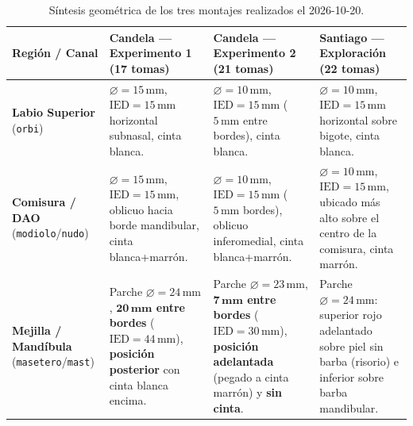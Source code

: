 \documentclass[11pt, a4paper]{article}
\begin{document}
\begin{table}[H]
\centering
\scriptsize
\begin{tabularx}{\textwidth}{l p{4.2cm} p{4.4cm} X}
\toprule
\textbf{Región / Canal} & \textbf{Candela --- Experimento 1} (17 tomas) & \textbf{Candela --- Experimento 2} (21 tomas) & \textbf{Santiago --- Exploración} (22 tomas) \\
\midrule
\textbf{Labio Superior} (\texttt{orbi}) & $\varnothing=15\,\text{mm}$, $\text{IED}=15\,\text{mm}$ horizontal subnasal, cinta blanca. & $\varnothing=10\,\text{mm}$, $\text{IED}=15\,\text{mm}$ ($5\,\text{mm}$ entre bordes), cinta blanca. & $\varnothing=10\,\text{mm}$, $\text{IED}=15\,\text{mm}$ horizontal sobre bigote, cinta blanca. \\
\textbf{Comisura / DAO} (\texttt{modiolo}/\texttt{nudo}) & $\varnothing=15\,\text{mm}$, $\text{IED}=15\,\text{mm}$, oblicuo hacia borde mandibular, cinta blanca+marrón. & $\varnothing=10\,\text{mm}$, $\text{IED}=15\,\text{mm}$ ($5\,\text{mm}$ bordes), oblicuo inferomedial, cinta blanca+marrón. & $\varnothing=10\,\text{mm}$, $\text{IED}=15\,\text{mm}$, ubicado más alto sobre el centro de la comisura, cinta marrón. \\
\textbf{Mejilla / Mandíbula} (\texttt{masetero}/\texttt{mast}) & Parche $\varnothing=24\,\text{mm}$, \textbf{$\mathbf{20\,\text{mm}}$ entre bordes} ($\text{IED}=44\,\text{mm}$), \textbf{posición posterior} con cinta blanca encima. & Parche $\varnothing=23\,\text{mm}$, \textbf{$\mathbf{7\,\text{mm}}$ entre bordes} ($\text{IED}=30\,\text{mm}$), \textbf{posición adelantada} (pegado a cinta marrón) y \textbf{sin cinta}. & Parche $\varnothing=24\,\text{mm}$: superior rojo adelantado sobre piel sin barba (risorio) e inferior sobre barba mandibular. \\
\bottomrule
\end{tabularx}
\caption{Síntesis geométrica de los tres montajes realizados el 2026-10-20.}
\label{tab:montajes_compacta}
\end{table}
\end{document}
